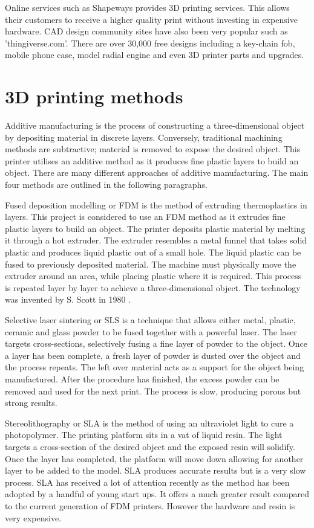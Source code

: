 \documentclass[a4paper, 11pt, twoside]{Thesis}  %
\begin{document}
Online services such as Shapeways provides 3D printing services. This allows their customers to receive a higher quality print without investing in expensive hardware. CAD design community sites have also been very popular such as 'thingiverse.com'. There are over 30,000 free designs including a key-chain fob, mobile phone case, model radial engine and even 3D printer parts and upgrades.

\section{3D printing methods}

Additive manufacturing is the process of constructing a three-dimensional object by depositing material in discrete layers. Conversely, traditional machining methods are subtractive; material is removed to expose the desired object. This printer utilises an additive method as it produces fine plastic layers to build an object. There are many different approaches of additive manufacturing. The main four methods are outlined in the following paragraphs.

Fused deposition modelling or FDM is the method of extruding thermoplastics in layers.
 This project is considered to use an FDM method as it extrudes fine plastic layers to build an object. The printer deposits plastic material by melting it through a hot extruder. The extruder resembles a metal funnel that takes solid plastic and produces liquid plastic out of a small hole. The liquid plastic can be fused to previously deposited material. The machine must physically move the extruder around an area, while placing plastic where it is required. This process is repeated layer by layer to achieve a three-dimensional object. The technology was invented by S. Scott in 1980 \cite{2}.

Selective laser sintering or SLS is a technique that allows either metal, plastic, ceramic and glass powder to be fused together with a powerful laser. The laser targets cross-sections, selectively fusing a fine layer of powder to the object. Once a layer has been complete, a fresh layer of powder is dusted over the object and the process repeats. The left over material acts as a support for the object being manufactured. After the procedure has finished, the excess powder can be removed and used for the next print. The process is slow, producing porous but strong results.

Stereolithography or SLA is the method of using an ultraviolet light to cure a photopolymer. The printing platform sits in a vat of liquid resin. The light targets a cross-section of the desired object and the exposed resin will solidify. Once the layer has completed, the platform will move down allowing for another layer to be added to the model. SLA produces accurate results but is a very slow process. SLA has received a lot of attention recently as the method has been adopted by a handful of young start ups. It offers a much greater result compared to the current generation of FDM printers. However the hardware and resin is very expensive.
\end{document}
